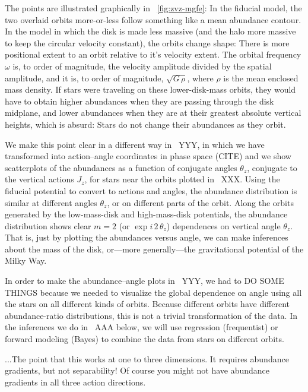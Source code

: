 \documentclass[modern]{aastex63}
\begin{document}
The points are illustrated graphically in \figurename~\ref{fig:zvz-mgfe}:
In the fiducial model, the two overlaid orbits more-or-less follow something
like a mean abundance contour.
In the model in which the disk is made less massive (and the halo more massive
to keep the circular velocity constant), the orbits change shape: There is more
positional extent to an orbit relative to it's velocity extent.
The orbital frequency $\omega$ is, to order of magnitude, the velocity amplitude
divided by the spatial amplitude, and it is, to order of magnitude, $\sqrt{G\,\rho}$,
where $\rho$ is the mean enclosed mass density.
If stars were traveling on these lower-disk-mass orbits, they would have to
obtain higher abundances when they are passing through the disk midplane,
and lower abundances when they are at their greatest absolute vertical heights,
which is absurd: Stars do not change their abundances as they orbit.

We make this point clear in a different way in \figurename~YYY, in which
we have transformed into action--angle coordinates in phase space (CITE)
and we show scatterplots of the abundances as a function of conjugate
angles $\theta_z$, conjugate to the vertical actions $J_z$, for stars near
the orbits plotted in \figurename~XXX.
Using the fiducial potential to convert to actions and angles,
the abundance distribution is similar at different
angles $\theta_z$, or on different parts of the orbit.
Along the orbits generated by the low-mass-disk and high-mass-disk potentials,
the abundance distribution shows clear $m=2$ (or $\exp i\,2\,\theta_z$) dependences
on vertical angle $\theta_z$.
That is, just by plotting the abundances versus angle, we can make
inferences about the mass of the disk, or---more generally---the
gravitational potential of the Milky Way.

In order to make the abundance--angle plots in \figurename~YYY, we had
to DO SOME THINGS because we needed to visualize the global dependence
on angle using all the stars on all different kinds of orbits.
Because different orbits have different abundance-ratio
distributions, this is not a trivial transformation of the data.
In the inferences we do in \sectionname~AAA below, we
will use regression (frequentist) or forward modeling (Bayes) to
combine the data from stars on different orbits.

...The point that this works at one to three dimensions. It requires
abundance gradients, but not separability!  Of course you might not
have abundance gradients in all three action directions.
\end{document}
